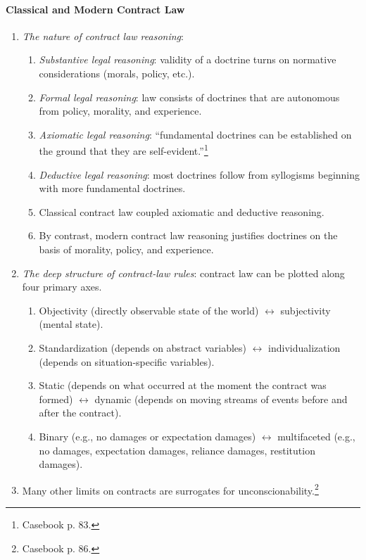 \paragraph{Classical and Modern Contract Law}

\begin{enumerate}
    \item \emph{The nature of contract law reasoning}:
    \begin{enumerate}
        \item \emph{Substantive legal reasoning}: validity of a doctrine turns 
        on normative considerations (morals, policy, etc.).
        \item \emph{Formal legal reasoning}: law consists of doctrines that 
        are autonomous from policy, morality, and experience.
        \item \emph{Axiomatic legal reasoning}: ``fundamental doctrines can be 
        established on the ground that they are 
        self-evident.''\footnote{Casebook p. 83.}
        \item \emph{Deductive legal reasoning}: most doctrines follow from 
        syllogisms beginning with more fundamental doctrines.
        \item Classical contract law coupled axiomatic and deductive 
        reasoning.
        \item By contrast, modern contract law reasoning justifies doctrines 
        on the basis of morality, policy, and experience.
    \end{enumerate}
    \item \emph{The deep structure of contract-law rules}: contract law can be 
    plotted along four primary axes.
    \begin{enumerate}
        \item Objectivity (directly observable state of the world) 
        $\leftrightarrow$ subjectivity (mental state).
        \item Standardization (depends on abstract variables) $\leftrightarrow$ 
        individualization (depends on situation-specific variables).
        \item Static (depends on what occurred at the moment the contract was 
        formed) $\leftrightarrow$ dynamic (depends on moving streams of events 
        before and after the contract).
        \item Binary (e.g., no damages or expectation damages) 
        $\leftrightarrow$ multifaceted (e.g., no damages, expectation damages, 
        reliance damages, restitution damages).
    \end{enumerate}
    \item Many other limits on contracts are surrogates for 
    unconscionability.\footnote{Casebook p. 86.}
\end{enumerate}

